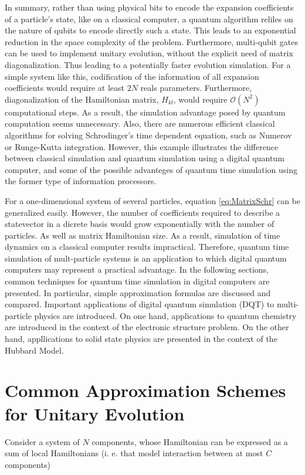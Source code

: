   In summary, rather than using physical bits to encode the expansion coefficients of a particle's state, like on a classical computer, a quantum algorithm reliles on the nature of qubits to encode directly such a state. This leads to an exponential reduction in the space complexity of the problem. Furthermore, multi-qubit gates can be used to implement unitary evolution, without the explicit need of matrix diagonalization. Thus leading to a potentially faster evolution simulation. For a simple system like this, codification of the information of all expansion coefficients would require at least $2N$ reals parameters. Furthermore, diagonalization of the Hamiltonian matrix, $H_{kl}$, would require $\mathcal{O}(N^2)$ computational steps. As a result, the simulation advantage posed by quantum computation seems unnecessary. Also, there are numerous efficient classical algorithms for solving Schrodinger's time dependent equation, such as Numerov or Runge-Kutta integration. However, this example illustrates the difference between classical simulation and quantum simulation using a digital quantum computer, and some of the possible advanteges of quantum time simulation using the former type of information processors.

  For a one-dimensional system of several particles, equation \ref{eq:MatrixSchr} can be generalized easily. However, the number of coefficients required to describe a statevector in a dicrete basis would grow exponentially with the number of particles. As well as matrix Hamiltonian size. As a result, simulation of time dynamics on a classical computer results impractical. Therefore, quantum time simulation of mult-particle systems is an application to which digital quantum computers may represent a practical advantage. In the following sections, common techniques for quantum time simulation in digital computers are presented. In particular, simple approximation formulas are discussed and compared. Important applications of  digital quantum simulation (DQT) to multi-particle physics are introduced. On one hand, applications to quantum chemistry are introduced in the context of the electronic structure problem. On the other hand, appllications to solid state physics are presented in the context of the Hubbard Model.


\section{Common Approximation Schemes for Unitary Evolution}
  Consider a system of $N$ components, whose Hamiltonian can be expressed as a sum of local Hamiltonians (i. e. that model interaction between at most $C$ components)

